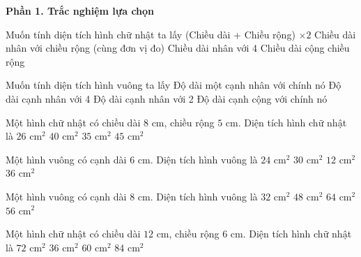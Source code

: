 \textbf{Phần 1. Trắc nghiệm lựa chọn}

\begin{ex} %
Muốn tính diện tích hình chữ nhật ta lấy
\choice
{(Chiều dài + Chiều rộng) $\times 2$}
{\True Chiều dài nhân với chiều rộng (cùng đơn vị đo)}
{Chiều dài nhân với 4}
{Chiều dài cộng chiều rộng}
\end{ex}

\begin{ex} %
Muốn tính diện tích hình vuông ta lấy
\choice
{\True Độ dài một cạnh nhân với chính nó}
{Độ dài cạnh nhân với 4}
{Độ dài cạnh nhân với 2}
{Độ dài cạnh cộng với chính nó}
\end{ex}

\begin{ex} %
Một hình chữ nhật có chiều dài $8\text{ cm}$, chiều rộng $5\text{ cm}$. Diện tích hình chữ nhật là
\choice
{$26\text{ cm}^2$}
{\True $40\text{ cm}^2$}
{$35\text{ cm}^2$}
{$45\text{ cm}^2$}
\end{ex}

\begin{ex} %
Một hình vuông có cạnh dài $6\text{ cm}$. Diện tích hình vuông là
\choice
{$24\text{ cm}^2$}
{$30\text{ cm}^2$}
{$12\text{ cm}^2$}
{\True $36\text{ cm}^2$}
\end{ex}

\begin{ex} %
Một hình vuông có cạnh dài $8\text{ cm}$. Diện tích hình vuông là
\choice
{$32\text{ cm}^2$}
{$48\text{ cm}^2$}
{\True $64\text{ cm}^2$}
{$56\text{ cm}^2$}
\end{ex}

\begin{ex} %
Một hình chữ nhật có chiều dài $12\text{ cm}$, chiều rộng $6\text{ cm}$. Diện tích hình chữ nhật là
\choice
{\True $72\text{ cm}^2$}
{$36\text{ cm}^2$}
{$60\text{ cm}^2$}
{$84\text{ cm}^2$}
\end{ex}

